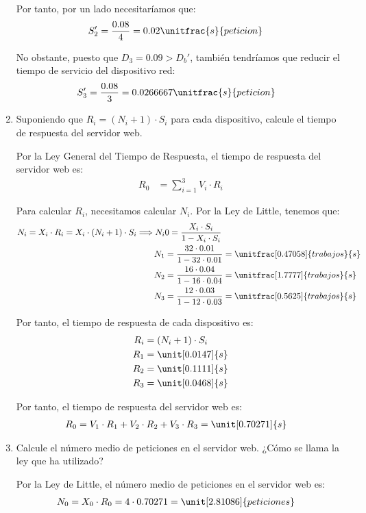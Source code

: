 \begin{ejercicio}
\begin{enumerate}
        Por tanto, por un lado necesitaríamos que:
        \begin{align*}
            S_2' &= \dfrac{0.08}{4} = 0.02 \unitfrac{s}{peticion}
        \end{align*}

        No obstante, puesto que $D_3=0.09>D_b'$, también tendríamos que reducir el tiempo de servicio del dispositivo red:
        \begin{align*}
            S_3' &= \dfrac{0.08}{3} = 0.0266667 \unitfrac{s}{peticion}
        \end{align*}
        \item Suponiendo que $R_i=(N_i+1)\cdot S_i$ para cada dispositivo, calcule el tiempo de respuesta del servidor web.
        
        Por la Ley General del Tiempo de Respuesta, el tiempo de respuesta del servidor web es:
        \begin{align*}
            R_0 &= \sum_{i=1}^{3} V_i \cdot R_i
        \end{align*}

        Para calcular $R_i$, necesitamos calcular $N_i$. Por la Ley de Little, tenemos que:
        \begin{align*}
            N_i = X_i \cdot R_i
            = X_i \cdot (N_i + 1) \cdot S_i
            \Longrightarrow N_i &0= \dfrac{X_i \cdot S_i}{1 - X_i \cdot S_i}\\
            N_1 &= \dfrac{32 \cdot 0.01}{1 - 32 \cdot 0.01} = \unitfrac[0.47058]{trabajos}{s} \\
            N_2 &= \dfrac{16 \cdot 0.04}{1 - 16 \cdot 0.04} = \unitfrac[1.7777]{trabajos}{s} \\
            N_3 &= \dfrac{12 \cdot 0.03}{1 - 12 \cdot 0.03} = \unitfrac[0.5625]{trabajos}{s}
        \end{align*}

        Por tanto, el tiempo de respuesta de cada dispositivo es:
        \begin{align*}
            R_i &= (N_i + 1) \cdot S_i\\
            R_1 &= \unit[0.0147]{s} \\
            R_2 &= \unit[0.1111]{s} \\
            R_3 &= \unit[0.0468]{s}
        \end{align*}

        Por tanto, el tiempo de respuesta del servidor web es:
        \begin{align*}
            R_0 &= V_1 \cdot R_1 + V_2 \cdot R_2 + V_3 \cdot R_3 = \unit[0.70271]{s}
        \end{align*}
        \item Calcule el número medio de peticiones en el servidor web. ¿Cómo se llama la ley que ha utilizado?
        
        Por la Ley de Little, el número medio de peticiones en el servidor web es:
        \begin{align*}
            N_0 &= X_0 \cdot R_0 = 4 \cdot 0.70271 = \unit[2.81086]{peticiones}
        \end{align*}
    \end{enumerate}
\end{ejercicio}
